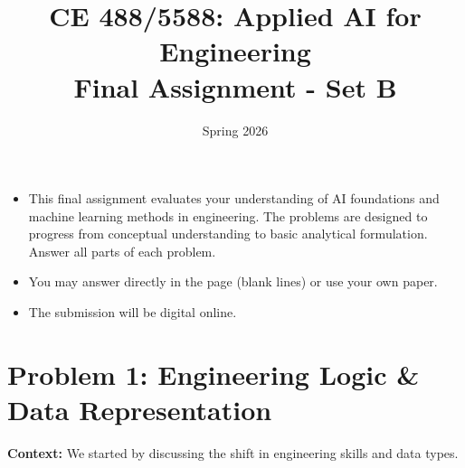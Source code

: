 \documentclass[12pt]{article}
\begin{document}
\title{CE 488/5588: Applied AI for Engineering \\ Final Assignment - Set B}
\author{}
\date{Spring 2026}

\maketitle

\begin{center}
\end{center}

\newpage

\begin{ch-box}
\begin{itemize}

    \item This final assignment evaluates your understanding of AI foundations and machine learning methods in engineering. The problems are designed to progress from conceptual understanding to basic analytical formulation. Answer all parts of each problem.


    \item You may answer directly in the page (blank lines) or use your own paper.

    \item The submission will be digital online.

\end{itemize}
\end{ch-box}

\section{Problem 1: Engineering Logic \& Data Representation}
\textbf{Context:} We started by discussing the shift in engineering skills and data types.
\end{document}
